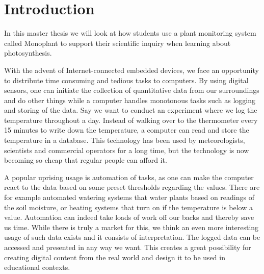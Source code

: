 \setcounter{page}{1}
\chapter{Introduction}
In this master thesis we will look at how students use a plant monitoring system called Monoplant to support their scientific inquiry when learning about photosynthesis. 


With the advent of Internet-connected embedded devices, we face an opportunity to distribute time consuming and tedious tasks to computers. By using digital sensors, one can initiate the collection of quantitative data from our surroundings and do other things while a computer handles monotonous tasks such as logging and storing of the data. Say we want to conduct an experiment where we log the temperature throughout a day. Instead of walking over to the thermometer every 15 minutes to write down the temperature, a computer can read and store the temperature in a database. This technology has been used by meteorologists, scientists and commercial operators for a long time, but the technology is now becoming so cheap that regular people can afford it. %

A popular uprising usage is automation of tasks, as one can make the computer react to the data based on some preset thresholds regarding the values. There are for example automated watering systems that water plants based on readings of the soil moisture, or heating systems that turn on if the temperature is below a value. Automation can indeed take loads of work off our backs and thereby save us time. While there is truly a market for this, we think an even more interesting usage of such data exists and it consists of interpretation. The logged data can be accessed and presented in any way we want. This creates a great possibility for creating digital content from the real world and design it to be used in educational contexts.


